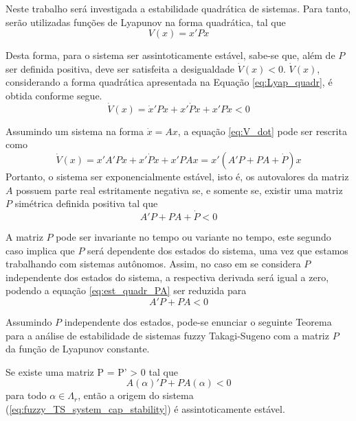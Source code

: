 Neste trabalho será investigada a estabilidade quadrática de sistemas. Para tanto, serão utilizadas funções de Lyapunov na forma quadrática, tal que
\begin{equation}\label{eq:Lyap_quadr}
V(x) = x'Px
\end{equation}

Desta forma, para o sistema ser assintoticamente estável, sabe-se que, além de $P$ ser definida positiva, deve ser satisfeita a desigualdade $\dot{V}(x) < 0$. $\dot{V}(x)$, considerando a forma quadrática apresentada na Equação \ref{eq:Lyap_quadr}, é obtida conforme segue.
\begin{equation}\label{eq:V_dot}
\dot{V}(x) = \dot{x}'Px + x'\dot{P}x + x'P\dot{x} < 0
\end{equation}

Assumindo um sistema na forma $\dot{x} = Ax$, a equação \ref{eq:V_dot} pode ser rescrita como
\begin{equation}\label{eq:V_dot_A}
\dot{V}(x) = x'A'Px + x'\dot{P}x + x'PAx = x'(A'P + PA + \dot{P})x 
\end{equation}
Portanto, o sistema ser exponencialmente estável, isto é, os autovalores da matriz $A$ possuem parte real estritamente negativa se, e somente se, existir uma matriz $P$ simétrica definida positiva tal que \cite{bookboydl:1994}
\begin{equation}\label{eq:est_quadr_PA}
A'P + PA + \dot{P} < 0
\end{equation}

A matriz $P$ pode ser invariante no tempo ou variante no tempo, este segundo caso implica que $P$ será dependente dos estados do sistema, uma vez que estamos trabalhando com sistemas autônomos. Assim, no caso em se considera $P$ independente dos estados do sistema, a respectiva derivada será igual a zero, podendo a equação \ref{eq:est_quadr_PA} ser reduzida para 
\begin{equation}\label{eq:metodo_Lyapunov}
A'P + PA < 0
\end{equation}

Assumindo $P$ independente dos estados, pode-se enunciar o seguinte Teorema para a análise de estabilidade de sistemas fuzzy Takagi-Sugeno com a matriz $P$ da função de Lyapunov constante.
\begin{theorem}\label{th:est_boyd} Se existe uma matriz P = P' > 0 tal que
	\begin{equation}\label{eq:LMIs_est_met_3}
	A(\alpha)'P + PA(\alpha) < 0
	\end{equation}
	para todo $\alpha \in \Lambda_r$, então a origem do sistema (\ref{eq:fuzzy_TS_system_cap_stability}) é assintoticamente estável.
\end{theorem}


